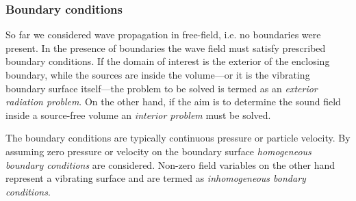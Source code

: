 \subsubsection{Boundary conditions}
\label{Section:Theory:Boundary_conditions}

So far we considered wave propagation in free-field, i.e. no boundaries were present.
In the presence of boundaries the wave field must satisfy prescribed boundary conditions.
If the domain of interest is the exterior of the enclosing boundary, while the sources are inside the volume---or it is the vibrating boundary surface itself---the problem to be solved is termed as an \emph{exterior radiation problem}. On the other hand, if the aim is to determine the sound field inside a source-free volume an \emph{interior problem} must be solved.

The boundary conditions are typically continuous pressure or particle velocity. By assuming zero pressure or velocity on the boundary surface \emph{homogeneous boundary conditions} are considered. Non-zero field variables on the other hand represent a vibrating surface and are termed as \emph{inhomogeneous bondary conditions}.

